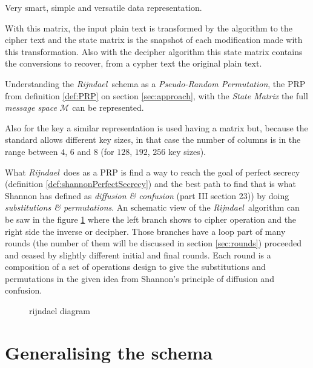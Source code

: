 \documentclass[10pt,a4paper,twoside]{llncs}
\newcommand{\rijndael}{\emph{Rijndael}}
\begin{document}
Very smart, simple and versatile data representation.

With this matrix, the input plain text is transformed by the algorithm to the cipher text and the state matrix is the snapshot of each modification made with this transformation. Also with the decipher algorithm this state matrix contains the conversions to recover, from a cypher text the original plain text.

Understanding the \rijndael\, schema as a \emph{Pseudo-Random Permutation}, the PRP from definition \ref{def:PRP} on section \ref{sec:approach}, with the \emph{State Matrix} the full \emph{message space} $\mathcal{M}$ can be represented.

Also for the key a similar representation is used having a matrix but, because the standard allows different key sizes, in that case the number of columns is in the range between $4$, $6$ and $8$ (for $128$, $192$, $256$ key sizes).

What \rijndael\, does as a PRP is find a way to reach the goal of perfect secrecy (definition \ref{def:shannonPerfectSecrecy}) and the best path to find that is what Shannon has defined as \emph{diffusion \& confusion} \cite{shannon-comTheorySecSys} (part III section 23)) by doing \emph{substitutions \& permutations}. An schematic view of the \rijndael\, algorithm can be saw in the figure \ref{fig:RijndaelDiagram} where the left branch shows to cipher operation and the right side the inverse or decipher. Those branches have a loop part of many rounds (the number of them will be discussed in section \ref{sec:rounds}) proceeded and ceased by slightly different initial and final rounds. Each round is a composition of a set of operations design to give the substitutions and permutations in the given idea from Shannon's principle of diffusion and confusion.

\begin{figure}[ht]
\begin{center}
 \scalebox{0.55}{}
 \caption{rijndael diagram}
 \label{fig:RijndaelDiagram}
\end{center}
\end{figure}

\section{Generalising the schema}\label{sec:generalising}
\end{document}
